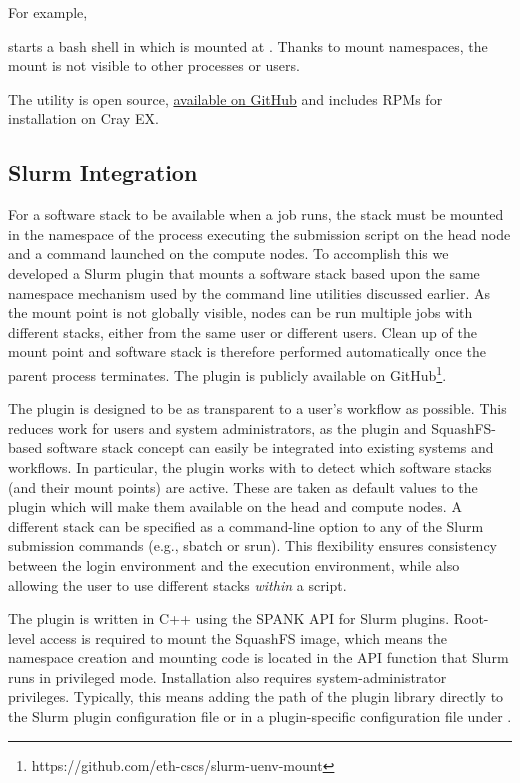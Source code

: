 For example,



starts a bash shell in which  is mounted at .
Thanks to mount namespaces, the mount is not visible to other processes or users.

The utility is open source, \href{https://github.com/eth-cscs/squashfs-mount}{available on GitHub} and includes RPMs for installation on Cray EX.

\subsection{Slurm Integration}

For a software stack to be available when a job runs, the stack must be mounted in the namespace of the process executing the submission script on the head node and a command launched on the compute nodes.
To accomplish this we developed a Slurm plugin that mounts a software stack based upon the same namespace mechanism used by the command line utilities discussed earlier.
As the mount point is not globally visible, nodes can be run multiple jobs with different stacks, either from the same user or different users.
Clean up of the mount point and software stack is therefore performed automatically once the parent process terminates.
The plugin is publicly available on GitHub\footnote{https://github.com/eth-cscs/slurm-uenv-mount}.

The plugin is designed to be as transparent to a user's workflow as possible.
This reduces work for users and system administrators, as the plugin and SquashFS-based software stack concept can easily be integrated into existing systems and workflows.
In particular, the plugin works with  to detect which software stacks (and their mount points) are active.
These are taken as default values to the plugin which will make them available on the head and compute nodes.
A different stack can be specified as a command-line option to any of the Slurm submission commands (e.g., sbatch or srun).
This flexibility ensures consistency between the login environment and the execution environment, while also allowing the user to use different stacks \emph{within} a script.

The plugin is written in C++ using the SPANK API for Slurm plugins.
Root-level access is required to mount the SquashFS image, which means the namespace creation and mounting code is located in the API function that Slurm runs in privileged mode.
Installation also requires system-administrator privileges.
Typically, this means adding the path of the plugin library directly to the Slurm plugin configuration file  or in a plugin-specific configuration file under .

